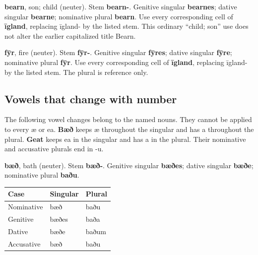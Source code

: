 \textbf{bearn}, son; child (neuter). Stem \textbf{bearn-}. Genitive singular \textbf{bearnes}; dative singular \textbf{bearne}; nominative plural \textbf{bearn}. Use every corresponding cell of \textbf{īgland}, replacing īgland- by the listed stem. This ordinary “child; son” use does not alter the earlier capitalized title Bearn.

\textbf{fȳr}, fire (neuter). Stem \textbf{fȳr-}. Genitive singular \textbf{fȳres}; dative singular \textbf{fȳre}; nominative plural \textbf{fȳr}. Use every corresponding cell of \textbf{īgland}, replacing īgland- by the listed stem. The plural is reference only.

\subsection*{Vowels that change with number}

The following vowel changes belong to the named nouns. They cannot be applied to every æ or ea. \textbf{Bæð} keeps æ throughout the singular and has a throughout the plural. \textbf{Geat} keeps ea in the singular and has a in the plural. Their nominative and accusative plurals end in -u.

\textbf{bæð}, bath (neuter). Stem \textbf{bæð-}. Genitive singular \textbf{bæðes}; dative singular \textbf{bæðe}; nominative plural \textbf{baðu}.

\par\begingroup
\fontsize{10.5}{13.2}\selectfont
\setlength{\LTleft}{0pt}\setlength{\LTright}{\fill}
\noindent
\begin{tabular}{@{}>{\raggedright\arraybackslash}p{39.46mm}>{\raggedright\arraybackslash}p{39.46mm}>{\raggedright\arraybackslash}p{39.46mm}@{}}
\toprule
\textbf{Case} & \textbf{Singular} & \textbf{Plural} \\
\midrule
Nominative & bæð & baðu \\
Genitive & bæðes & baða \\
Dative & bæðe & baðum \\
Accusative & bæð & baðu \\
\bottomrule
\end{tabular}
\par\endgroup

